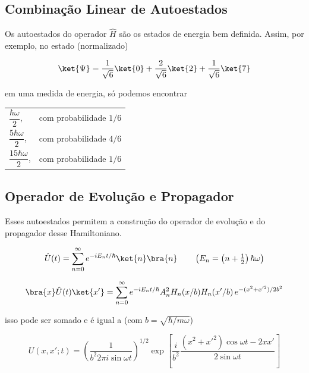 \subsection*{Combinação Linear de Autoestados}

Os autoestados do operador $\hat{H}$ são os estados de energia bem definida. Assim, por exemplo, no estado (normalizado)

\begin{equation}
    \ket{\Psi} = \frac{1}{\sqrt{6}}\ket{0} + \frac{2}{\sqrt{6}}\ket{2} + \frac{1}{\sqrt{6}}\ket{7}
\label{eq:aula16_estado_combinacao}
\end{equation}

em uma medida de energia, só podemos encontrar

\begin{center}
\begin{tabular}{ll}
    $\dfrac{\hbar\omega}{2}$, & com probabilidade $1/6$ \\[2mm]
    $\dfrac{5\hbar\omega}{2}$, & com probabilidade $4/6$ \\[2mm]
    $\dfrac{15\hbar\omega}{2}$, & com probabilidade $1/6$
\end{tabular}
\end{center}

\subsection*{Operador de Evolução e Propagador}

Esses autoestados permitem a construção do operador de evolução e do propagador desse Hamiltoniano.

\begin{equation}
    \hat{U}(t) = \sum_{n=0}^{\infty} e^{-iE_n t/\hbar}\ket{n}\bra{n} \qquad \left(E_n = \left(n+\tfrac{1}{2}\right)\hbar\omega\right)
\label{eq:aula16_operador_evolucao}
\end{equation}

\begin{equation}
    \bra{x}\hat{U}(t)\ket{x'} = \sum_{n=0}^{\infty} e^{-iE_n t/\hbar} A_n^2 H_n(x/b) H_n(x'/b)\, e^{-(x^2+x'^2)/2b^2}
\label{eq:aula16_propagador_serie}
\end{equation}

isso pode ser somado e é igual a (com $b = \sqrt{\hbar/m\omega}$)

\begin{equation}
    \boxed{U(x,x';t) = \left( \frac{1}{b^2 2\pi i \sin\omega t} \right)^{1/2} \exp\left[ \frac{i}{b^2}\frac{(x^2+x'^2)\cos\omega t - 2xx'}{2\sin\omega t} \right]}
\label{eq:aula16_propagador_fechado}
\end{equation}

